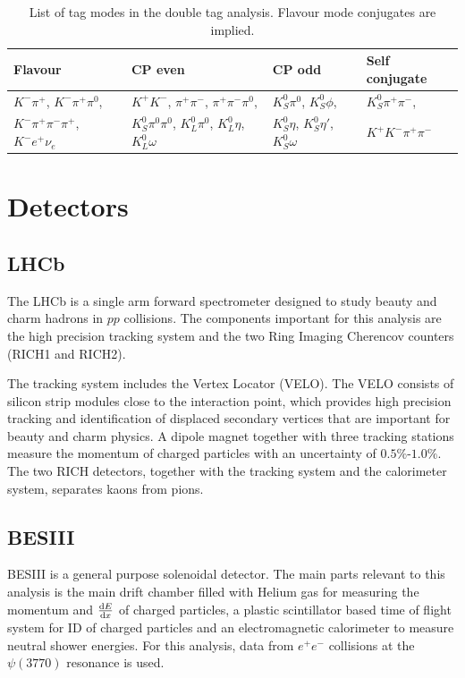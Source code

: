 \documentclass[12pt, a4paper, notitlepage, onecolumn]{article}
\begin{document}
\begin{table}[H]
  \centering
  \caption{List of tag modes in the double tag analysis. Flavour mode conjugates are implied.}
  \label{table_tag_modes}
  \begin{tabular}{llll} 
    \toprule
    Flavour & CP even & CP odd & Self conjugate \\
    \midrule
    $K^-\pi^+$, $K^-\pi^+\pi^0$,         & $K^+K^-$, $\pi^+\pi^-$, $\pi^+\pi^-\pi^0$,                  & $K_S^0\pi^0$, $K_S^0\phi$,               & $K_S^0\pi^+\pi^-$, \\
    $K^-\pi^+\pi^-\pi^+$, $K^- e^+\nu_e$ & $K_S^0\pi^0\pi^0$, $K_L^0\pi^0$, $K_L^0\eta$, $K_L^0\omega$ & $K_S^0\eta$, $K_S^0\eta'$, $K_S^0\omega$ & $K^+K^-\pi^+\pi^-$ \\
    \bottomrule
  \end{tabular}
\end{table}
\section{Detectors}
\subsection{LHCb}
\noindent The LHCb \cite{cite_LHCb} is a single arm forward spectrometer designed to study beauty and charm hadrons in $pp$ collisions. The components important for this analysis are the high precision tracking system and the two Ring Imaging Cherencov counters (RICH1 and RICH2).

The tracking system includes the Vertex Locator (VELO). The VELO consists of silicon strip modules close to the interaction point, which provides high precision tracking and identification of displaced secondary vertices that are important for beauty and charm physics. A dipole magnet together with three tracking stations measure the momentum of charged particles with an uncertainty of $0.5\%$-$1.0\%$. The two RICH detectors, together with the tracking system and the calorimeter system, separates kaons from pions.
\subsection{BESIII}
\noindent BESIII \cite{cite_BESIII} is a general purpose solenoidal detector. The main parts relevant to this analysis is the main drift chamber filled with Helium gas for measuring the momentum and $\dv{E}{x}$ of charged particles, a plastic scintillator based time of flight system for ID of charged particles and an electromagnetic calorimeter to measure neutral shower energies. For this analysis, data from $e^+e^-$ collisions at the $\psi(3770)$ resonance is used.
\end{document}
